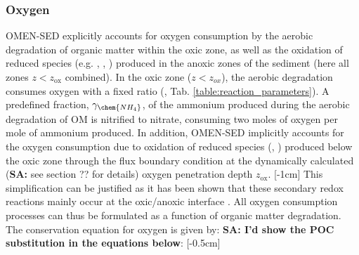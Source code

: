 \documentclass[gmd, manuscript]{copernicus}
\begin{document}
\subsubsection{Oxygen}\label{subsubsec:O2}
OMEN-SED explicitly accounts for oxygen consumption by the aerobic degradation of organic matter within the oxic zone, as well as the oxidation of reduced species (e.g. , , ) 
produced in the anoxic zones of the sediment (here all zones $z < z_{\mathrm{ox}}$ combined). In the oxic zone ($z<z_{ox}$), the aerobic degradation consumes oxygen with a fixed  ratio (, Tab. \ref{table:reaction_parameters}). 
A predefined fraction, $\gamma_\chem{NH_4}$, of the ammonium produced during the aerobic degradation of OM is nitrified to nitrate, consuming two moles of oxygen per mole of ammonium produced. 
In addition, OMEN-SED implicitly accounts for the oxygen consumption due to oxidation of reduced species (, ) produced below the oxic zone through the flux boundary condition at the dynamically calculated 
(\textbf{SA:} see section ?? for details) oxygen penetration depth $z_{\mathrm{ox}}$. 
[-1cm]%
This simplification can be justified as it has been shown that these secondary redox reactions mainly occur at the oxic/anoxic 
interface \citep{soetaert_model_1996}. All oxygen consumption processes can thus be formulated as a function of organic matter degradation. 
The conservation equation for oxygen is given by: \textbf{SA: I'd show the POC substitution in the equations below}:
[-0.5cm]%
\end{document}
